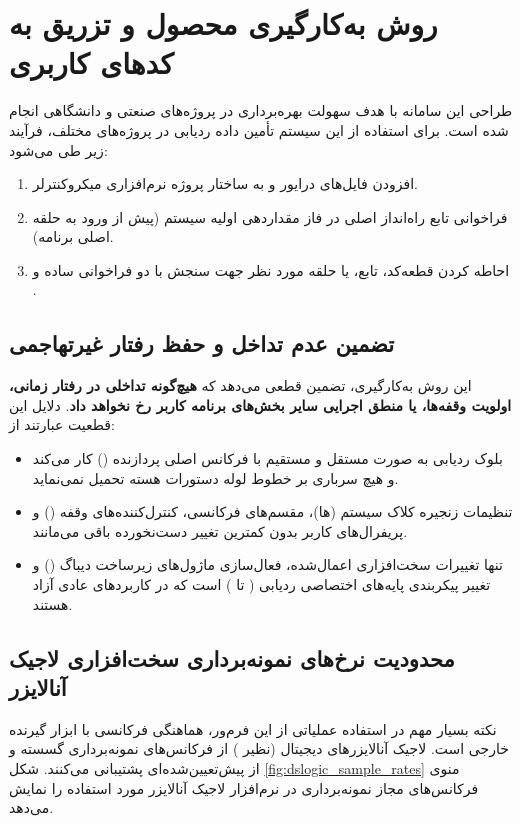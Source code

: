 \section{روش به‌کارگیری محصول و تزریق به کدهای کاربری}
\label{sec:product_usage_workflow}
طراحی این سامانه با هدف سهولت بهره‌برداری در پروژه‌های صنعتی و دانشگاهی انجام شده است. برای استفاده از این سیستم تأمین داده ردیابی در پروژه‌های مختلف، فرآیند زیر طی می‌شود:
\begin{enumerate}
    \item افزودن فایل‌های درایور  و  به ساختار پروژه نرم‌افزاری میکروکنترلر.
    \item فراخوانی تابع راه‌انداز اصلی  در فاز مقداردهی اولیه سیستم (پیش از ورود به حلقه اصلی برنامه).
    \item احاطه کردن قطعه‌کد، تابع، یا حلقه مورد نظر جهت سنجش  با دو فراخوانی ساده  و .
\end{enumerate}

\subsection{تضمین عدم تداخل و حفظ رفتار غیرتهاجمی}
این روش به‌کارگیری، تضمین قطعی می‌دهد که \textbf{هیچ‌گونه تداخلی در رفتار زمانی، اولویت وقفه‌ها، یا منطق اجرایی سایر بخش‌های برنامه کاربر رخ نخواهد داد}. دلایل این قطعیت عبارتند از:
\begin{itemize}
    \item بلوک ردیابی  به صورت مستقل و مستقیم با فرکانس اصلی پردازنده () کار می‌کند و هیچ سرباری بر خطوط لوله دستورات هسته تحمیل نمی‌نماید.
    \item تنظیمات زنجیره کلاک سیستم (ها)، مقسم‌های فرکانسی، کنترل‌کننده‌های وقفه () و پریفرال‌های کاربر بدون کمترین تغییر دست‌نخورده باقی می‌مانند.
    \item تنها تغییرات سخت‌افزاری اعمال‌شده، فعال‌سازی ماژول‌های زیرساخت دیباگ () و تغییر پیکربندی پایه‌های اختصاصی ردیابی ( تا ) است که در کاربردهای عادی آزاد هستند.
\end{itemize}

\subsection{محدودیت نرخ‌های نمونه‌برداری سخت‌افزاری لاجیک آنالایزر}
نکته بسیار مهم در استفاده عملیاتی از این فرم‌ور، هماهنگی فرکانسی با ابزار گیرنده خارجی است. لاجیک آنالایزرهای دیجیتال (نظیر ) از فرکانس‌های نمونه‌برداری گسسته و از پیش‌تعیین‌شده‌ای پشتیبانی می‌کنند. شکل \ref{fig:dslogic_sample_rates} منوی فرکانس‌های مجاز نمونه‌برداری در نرم‌افزار لاجیک آنالایزر مورد استفاده را نمایش می‌دهد.

